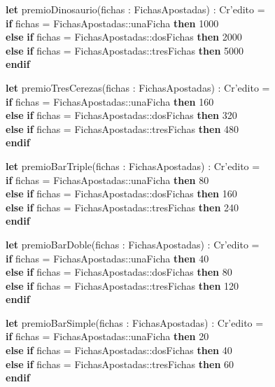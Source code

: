 \begin{itemize}
    \textbf{let} premioDinosaurio(fichas : FichasApostadas) : Cr'edito =\\
        \textbf{if} fichas = FichasApostadas::unaFicha \textbf{then} 1000\\
        \textbf{else} \textbf{if} fichas = FichasApostadas::dosFichas \textbf{then} 2000\\
        \textbf{else} \textbf{if} fichas = FichasApostadas::tresFichas \textbf{then} 5000\\
        \textbf{endif}

    \textbf{let} premioTresCerezas(fichas : FichasApostadas) : Cr'edito =\\
        \textbf{if} fichas = FichasApostadas::unaFicha \textbf{then} 160\\
        \textbf{else} \textbf{if} fichas = FichasApostadas::dosFichas \textbf{then} 320\\
        \textbf{else} \textbf{if} fichas = FichasApostadas::tresFichas \textbf{then} 480\\
        \textbf{endif}

    \textbf{let} premioBarTriple(fichas : FichasApostadas) : Cr'edito =\\
        \textbf{if} fichas = FichasApostadas::unaFicha \textbf{then} 80\\
        \textbf{else} \textbf{if} fichas = FichasApostadas::dosFichas \textbf{then} 160\\
        \textbf{else} \textbf{if} fichas = FichasApostadas::tresFichas \textbf{then} 240\\
        \textbf{endif}

    \textbf{let} premioBarDoble(fichas : FichasApostadas) : Cr'edito =\\
        \textbf{if} fichas = FichasApostadas::unaFicha \textbf{then} 40\\
        \textbf{else} \textbf{if} fichas = FichasApostadas::dosFichas \textbf{then} 80\\
        \textbf{else} \textbf{if} fichas = FichasApostadas::tresFichas \textbf{then} 120\\
        \textbf{endif}

    \textbf{let} premioBarSimple(fichas : FichasApostadas) : Cr'edito =\\
        \textbf{if} fichas = FichasApostadas::unaFicha \textbf{then} 20\\
        \textbf{else} \textbf{if} fichas = FichasApostadas::dosFichas \textbf{then} 40\\
        \textbf{else} \textbf{if} fichas = FichasApostadas::tresFichas \textbf{then} 60\\
        \textbf{endif}


\end{itemize}
